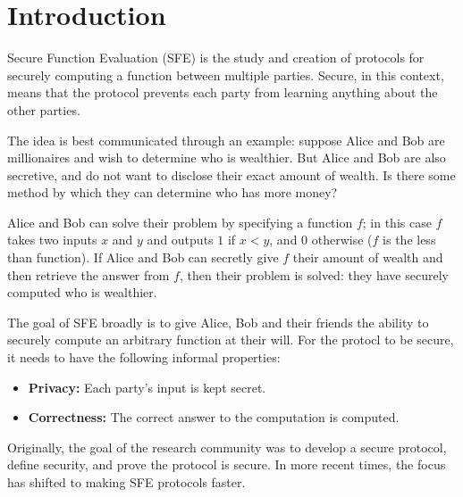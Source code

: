 \chapter*{Introduction}
\doublespacing


Secure Function Evaluation (SFE) is the study and creation of protocols for securely computing a function between multiple parties. 
Secure, in this context, means that the protocol prevents each party from learning anything about the other parties. 

The idea is best communicated through an example: suppose Alice and Bob are millionaires and wish to determine who is wealthier. 
But Alice and Bob are also secretive, and do not want to disclose their exact amount of wealth. 
Is there some method by which they can determine who has more money?

Alice and Bob can solve their problem by specifying a function $f$; in this case $f$ takes two inputs $x$ and $y$ and outputs $1$ if $x < y$, and $0$ otherwise ($f$ is the less than function).
If Alice and Bob can secretly give $f$ their amount of wealth and then retrieve the answer from $f$, then their problem is solved: they have securely computed who is wealthier.

The goal of SFE broadly is to give Alice, Bob and their friends the ability to securely compute an arbitrary function at their will. 
For the protocl to be secure, it needs to have the following informal properties:
\begin{itemize}
    \item \textbf{Privacy:} Each party's input is kept secret.
    \item \textbf{Correctness:} The correct answer to the computation is computed.
\end{itemize}

Originally, the goal of the research community was to develop a secure protocol, define security, and prove the protocol is secure.
In more recent times, the focus has shifted to making SFE protocols faster.


